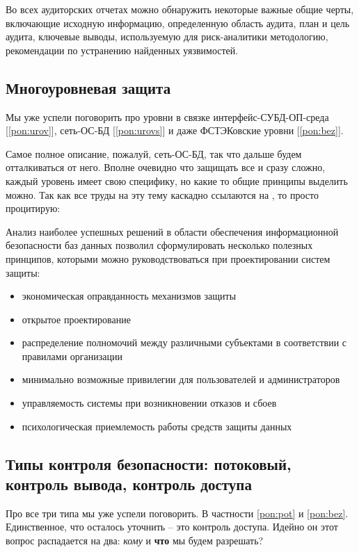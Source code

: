 Во всех аудиторских отчетах можно обнаружить некоторые важные общие черты, включающие исходную информацию, определенную область аудита, план и цель аудита, ключевые выводы, используемую для риск-аналитики методологию, рекомендации по устранению найденных уязвимостей.

\subsection{Многоуровневая защита}
Мы уже успели поговорить про уровни в связке интерфейс-СУБД-ОП-среда [\ref{pon:urov}],  сеть-ОС-БД [\ref{pon:urovs}] и даже ФСТЭКовские уровни [\ref{pon:bez}].

Самое полное описание, пожалуй, сеть-ОС-БД, так что дальше будем отталкиваться от него. Вполне очевидно что защищать все и сразу сложно, каждый уровень имеет свою специфику, но какие то общие принципы выделить можно. Так как все труды на эту тему каскадно ссылаются на \autocite{Smirnov2007}, то просто процитирую:
\begin{grayquote}
	Анализ наиболее успешных решений в области обеспе­чения информационной безопасности баз данных позволил сформулировать несколько полезных принципов, которыми можно руководствоваться при проектировании систем защиты:
	\begin{itemize}
		\item экономическая оправданность механизмов защиты
		\item открытое проектирование
		\item распределение полномочий между различными субъектами в соответствии с правилами организации
		\item минимально возможные привилегии для пользователей и администраторов
		\item управляемость системы при возникновении отказов и сбоев
		\item психологическая приемлемость работы средств защиты данных
	\end{itemize}
\end{grayquote}

\subsection{Типы контроля безопасности: потоковый, контроль вывода, контроль доступа}
Про все три типа мы уже успели поговорить. В частности \ref{pon:pot} и \ref{pon:bez}. Единственное, что осталось уточнить -- это контроль доступа. Идейно он этот вопрос распадается на два: \textit{кому} и \textbf{что} мы будем разрешать?

